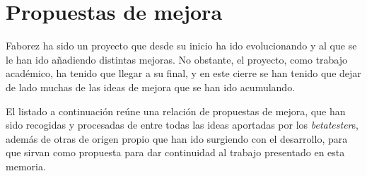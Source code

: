 \documentclass[main]{subfiles}
\begin{document}
\chapter{Propuestas de mejora}

Faborez ha sido un proyecto que desde su inicio ha ido evolucionando y al que se le han ido añadiendo distintas mejoras. No obstante, el proyecto, como trabajo académico, ha tenido que llegar a su final, y en este cierre se han tenido que dejar de lado muchas de las ideas de mejora que se han ido acumulando.

El listado a continuación reúne una relación de propuestas de mejora, que han sido recogidas y procesadas de entre todas las ideas aportadas por los \emph{betatester}s, además de otras de origen propio que han ido surgiendo con el desarrollo, para que sirvan como propuesta para dar continuidad al trabajo presentado en esta memoria.
\end{document}
